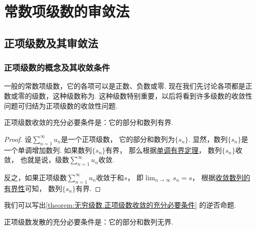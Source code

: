 \section{常数项级数的审敛法}
\subsection{正项级数及其审敛法}
\subsubsection{正项级数的概念及其收敛条件}
一般的常数项级数，它的各项可以是正数、负数或零.
现在我们先讨论各项都是正数或零的级数，这种级数称为.
这种级数特别重要，以后将看到许多级数的收敛性问题可归结为正项级数的收敛性问题.

\begin{theorem}\label{theorem:无穷级数.正项级数收敛的充分必要条件}
正项级数收敛的充分必要条件是：它的部分和数列有界.
\begin{proof}
设\(\sum_{n=1}^\infty u_n\)是一个正项级数，
它的部分和数列为\(\{s_n\}\).
显然，数列\(\{s_n\}\)是一个单调增加数列.
如果数列\(\{s_n\}\)有界，
那么根据\hyperref[theorem:极限.数列的单调有界定理]{单调有界定理}，
数列\(\{s_n\}\)收敛，
也就是说，级数\(\sum_{n=1}^\infty u_n\)收敛.

反之，如果正项级数\(\sum_{n=1}^\infty u_n\)收敛于和\(s\)，
即\(\lim_{n\to\infty} s_n = s\)，
根据\hyperref[theorem:极限.收敛数列的有界性]{收敛数列的有界性}可知，
数列\(\{s_n\}\)有界.
\end{proof}
\end{theorem}

我们可以写出\cref{theorem:无穷级数.正项级数收敛的充分必要条件} 的逆否命题.
\begin{proposition}
正项级数发散的充分必要条件是：它的部分和数列无界.
\end{proposition}


